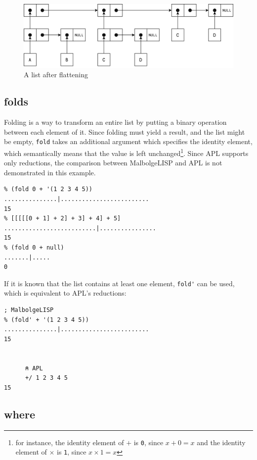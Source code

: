 \begin{figure}[H]
\centering
\includegraphics[width=\textwidth]{figures/afterFlattening.png}
\caption{A list after flattening}
\end{figure}

\subsection{folds}

\par Folding is a way to transform an entire list by putting a binary operation between each element of it. Since folding must yield a result, and the list might be empty, \verb|fold| takes an additional argument which specifies the identity element, which semantically means that the value is left unchanged\footnote{for instance, the identity element of $+$ is \verb|0|, since $x + 0 = x$ and the identity element of $\times$ is \verb|1|, since $x \times 1 = x$}. Since APL supports only reductions, the comparison between MalbolgeLISP and APL is not demonstrated in this example.

\begin{verbatim}
% (fold 0 + '(1 2 3 4 5))
...............|.........................
15
% [[[[[0 + 1] + 2] + 3] + 4] + 5]
..........................|................
15
% (fold 0 + null)
.......|.....
0
\end{verbatim}

\par If it is known that the list contains at least one element, \verb|fold'| can be used, which is equivalent to APL's reductions:

\begin{verbatim}
; MalbolgeLISP
% (fold' + '(1 2 3 4 5))
...............|.........................
15


      ⍝ APL
      +/ 1 2 3 4 5
15
\end{verbatim}

\subsection{where}

